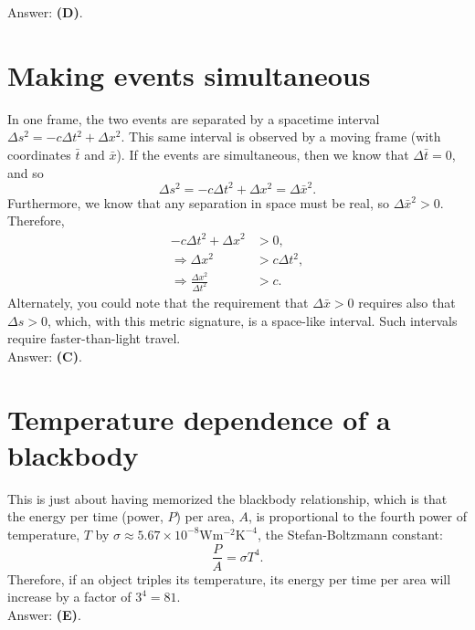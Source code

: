\documentclass[11pt]{paper}
\newcommand{\answer}[1]{Answer: \textbf{(#1)}.}
\begin{document}
\answer{D}

\section{Making events simultaneous}
In one frame, the two events are separated by a spacetime interval $\Delta s^2 = -c \Delta t^2 + \Delta x^2$.  This same interval is observed by a moving frame (with coordinates $\bar{t}$ and $\bar{x}$).  If the events are simultaneous, then we know that $\Delta \bar{t} = 0$, and so
\begin{equation}
\Delta s^2 = -c \Delta t^2 + \Delta x^2 = \Delta \bar{x}^2.
\end{equation}
Furthermore, we know that any separation in space must be real, so $\Delta \bar{x}^2 > 0$.  Therefore,
\begin{align}
-c \Delta t^2 + \Delta x^2 &> 0,\\
\Rightarrow\Delta x^2 &> c \Delta t^2,\\
\Rightarrow\frac{\Delta x^2}{\Delta t^2} &> c.
\end{align}
Alternately, you could note that the requirement that $\Delta\bar{x}>0$ requires also that $\Delta s>0$, which, with this metric signature, is a space-like interval.  Such intervals require faster-than-light travel.\\

\answer{C}

\section{Temperature dependence of a blackbody}
This is just about having memorized the blackbody relationship, which is that the energy per time (power, $P$) per area, $A$, is proportional to the fourth power of temperature, $T$ by $\sigma \approx 5.67 \times 10^{-8}\text{W}\text{m}^{-2}\text{K}^{-4}$, the Stefan-Boltzmann constant:
\begin{equation}
\frac{P}{A} = \sigma T^4.
\end{equation}
Therefore, if an object triples its temperature, its energy per time per area will increase by a factor of $3^4 = 81$.\\

\answer{E}
\end{document}
